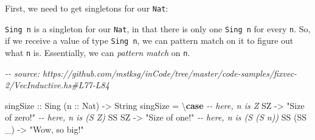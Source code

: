 \documentclass[]{article}
\newenvironment{Shaded}{}{}
\newcommand{\CommentTok}[1]{\textcolor[rgb]{0.38,0.63,0.69}{\textit{#1}}}
\newcommand{\DataTypeTok}[1]{\textcolor[rgb]{0.56,0.13,0.00}{#1}}
\newcommand{\KeywordTok}[1]{\textcolor[rgb]{0.00,0.44,0.13}{\textbf{#1}}}
\newcommand{\NormalTok}[1]{#1}
\newcommand{\OperatorTok}[1]{\textcolor[rgb]{0.40,0.40,0.40}{#1}}
\newcommand{\OtherTok}[1]{\textcolor[rgb]{0.00,0.44,0.13}{#1}}
\newcommand{\StringTok}[1]{\textcolor[rgb]{0.25,0.44,0.63}{#1}}
\begin{document}
First, we need to get singletons for our \texttt{Nat}:

\begin{Shaded}
\end{Shaded}

\texttt{Sing\ n} is a singleton for our \texttt{Nat}, in that there is only one
\texttt{Sing\ n} for every \texttt{n}. So, if we receive a value of type
\texttt{Sing\ n}, we can pattern match on it to figure out what \texttt{n} is.
Essentially, we can \emph{pattern match} on \texttt{n}.

\begin{Shaded}
\begin{Highlighting}[]
\CommentTok{{-}{-} source: https://github.com/mstksg/inCode/tree/master/code{-}samples/fixvec{-}2/VecInductive.hs\#L77{-}L84}

\OtherTok{singSize ::} \DataTypeTok{Sing}\NormalTok{ (}\OtherTok{n ::} \DataTypeTok{Nat}\NormalTok{) }\OtherTok{{-}\textgreater{}} \DataTypeTok{String}
\NormalTok{singSize }\OtherTok{=}\NormalTok{ \textbackslash{}}\KeywordTok{case}
    \CommentTok{{-}{-} here, n is \textquotesingle{}Z}
    \DataTypeTok{SZ}        \OtherTok{{-}\textgreater{}} \StringTok{"Size of zero!"}
    \CommentTok{{-}{-} here, n is (\textquotesingle{}S \textquotesingle{}Z)}
    \DataTypeTok{SS} \DataTypeTok{SZ}     \OtherTok{{-}\textgreater{}} \StringTok{"Size of one!"}
    \CommentTok{{-}{-} here, n is (\textquotesingle{}S (\textquotesingle{}S n))}
    \DataTypeTok{SS}\NormalTok{ (}\DataTypeTok{SS}\NormalTok{ \_) }\OtherTok{{-}\textgreater{}} \StringTok{"Wow, so big!"}
\end{Highlighting}
\end{Shaded}
\end{document}
